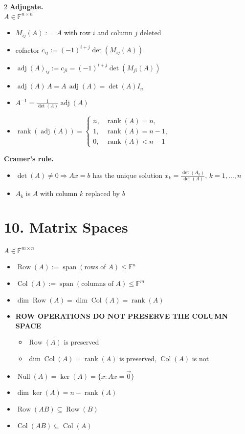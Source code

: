 \documentclass[fleqn]{article}
\newcommand{\subhead}[1]{\medskip\noindent\textbf{#1}}
\begin{document}
\begin{multicols}{2}
\subhead{Adjugate.}\\
$A \in \mathbb{F}^{n\times n}$
\begin{itemize}
\item $M_{ij}(A) :=$ $A$ with row $i$ and column $j$ deleted
\item cofactor $c_{ij} := (-1)^{i+j}\det(M_{ij}(A))$
\item $\operatorname{adj}(A)_{ij} := c_{ji} = (-1)^{i+j}\det(M_{ji}(A))$
\item $\operatorname{adj}(A)\,A = A\,\operatorname{adj}(A)=\det(A)I_n$
\item $A^{-1} = \tfrac{1}{\det(A)}\operatorname{adj}(A)$
\item $\operatorname{rank}(\operatorname{adj}(A)) =
\begin{cases}
n, & \operatorname{rank}(A)=n, \\
1, & \operatorname{rank}(A)=n-1, \\
0, & \operatorname{rank}(A) < n-1
\end{cases}$
\end{itemize}

\subhead{Cramer's rule.}
\begin{itemize}
\item $\det(A) \neq 0 \Rightarrow Ax=b$ has the unique solution $x_k = \tfrac{\det(A_k)}{\det(A)}$, $k=1,\dots,n$
\item $A_k$ is $A$ with column $k$ replaced by $b$
\end{itemize}

\section*{10. Matrix Spaces}
$A \in \mathbb{F}^{m\times n}$
\begin{itemize}
\item $\operatorname{Row}(A) := \operatorname{span}(\text{rows of } A) \le \mathbb{F}^n$
\item $\operatorname{Col}(A) := \operatorname{span}(\text{columns of } A) \le \mathbb{F}^m$
\item $\dim \operatorname{Row}(A) = \dim \operatorname{Col}(A) = \operatorname{rank}(A)$
\item {\color{red}\textbf{ROW OPERATIONS DO NOT PRESERVE THE COLUMN SPACE}}
\begin{itemize}
\item {\color{red}$\operatorname{Row}(A)$ is preserved}
\item {\color{red}$\dim \operatorname{Col}(A) = \operatorname{rank}(A)$ is preserved, $\operatorname{Col}(A)$ is not}
\end{itemize}
\item $\operatorname{Null}(A) = \ker(A) = \{x : Ax=\vec{0}\}$
\item $\dim \ker(A) = n - \operatorname{rank}(A)$
\item $\operatorname{Row}(AB) \subseteq \operatorname{Row}(B)$
\item $\operatorname{Col}(AB) \subseteq \operatorname{Col}(A)$
\end{itemize}


\end{multicols}
\end{document}
